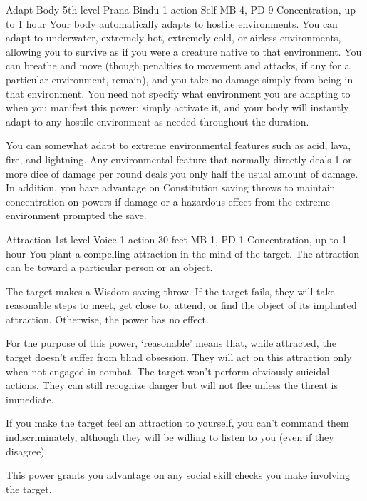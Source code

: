 \DndPowerHeader%
  {Adapt Body}
  {5th-level Prana Bindu}
  {1 action}
  {Self}
  {MB 4, PD 9}
  {Concentration, up to 1 hour}
Your body automatically adapts to hostile environments.
You can adapt to underwater, extremely hot, extremely cold,
or airless environments, allowing you to survive
as if you were a creature native to that environment.
You can breathe and move (though penalties to movement and attacks,
if any for a particular environment, remain),
and you take no damage simply from being in that environment.
You need not specify what environment you are adapting to
when you manifest this power;
simply activate it,
and your body will instantly adapt to any hostile environment
as needed throughout the duration.

You can somewhat adapt to extreme environmental features such as acid,
lava, fire, and lightning.
Any environmental feature that normally directly deals
1 or more dice of damage per round
deals you only half the usual amount of damage.
In addition,
you have advantage on Constitution saving throws to maintain
concentration on powers if damage or a hazardous effect from the
extreme environment prompted the save.

\DndPowerHeader%
  {Attraction}
  {1st-level Voice}
  {1 action}
  {30 feet}
  {MB 1, PD 1}
  {Concentration, up to 1 hour}
You plant a compelling attraction in the mind of the target.
The attraction can be toward a particular person or an object.

The target makes a Wisdom saving throw.
If the target fails, they will take reasonable steps to meet,
get close to, attend, or find the object of its implanted attraction.
Otherwise, the power has no effect.

For the purpose of this power, `reasonable' means that, while attracted,
the target doesn't suffer from blind obsession.
They will act on this attraction only when not engaged in combat.
The target won't perform obviously suicidal actions.
They can still recognize danger but will not flee
unless the threat is immediate.

If you make the target feel an attraction to yourself,
you can't command them indiscriminately,
although they will be willing to listen to you (even if they disagree).

This power grants you advantage on any social skill checks
you make involving the target.

